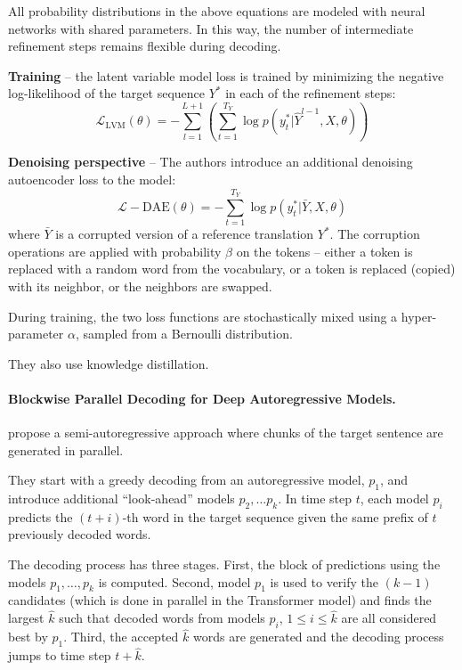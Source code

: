 All probability distributions in the above equations are modeled with neural
networks with shared parameters. In this way, the number of intermediate
refinement steps remains flexible during decoding.

\textbf{Training} -- the latent variable model loss is trained by minimizing the
negative log-likelihood of the target sequence $Y^*$ in each of the refinement
steps:
\begin{equation}
  \mathcal{L}_{\text{LVM}}(\theta) = - \sum_{l=1}^{L+1} \left(
    \sum_{t=1}^{T_Y} \log p(y_t^* | \hat{Y}^{l-1}, X, \theta)
  \right) \label{eq:refinement-lvm-loss}
\end{equation}


\textbf{Denoising perspective} -- The authors introduce an additional denoising
autoencoder loss to the model:
\begin{equation}
  \mathcal{L}-{\text{DAE}}(\theta) = - \sum_{t=1}^{T_Y} \log p(y_t^* | \bar{Y}, X, \theta)
\end{equation}
where $\bar{Y}$ is a corrupted version of a reference translation $Y^*$. The
corruption operations are applied with probability $\beta$ on the tokens --
either a token is replaced with a random word from the vocabulary, or a token is
replaced (copied) with its neighbor, or the neighbors are swapped.

During training, the two loss functions are stochastically mixed using a
hyper-parameter $\alpha$, sampled from a Bernoulli distribution.

They also use knowledge distillation.


\paragraph{Blockwise Parallel Decoding for Deep Autoregressive Models.}
\citet{stern2018blockwise} propose a semi-autoregressive approach where chunks
of the target sentence are generated in parallel.

They start with a greedy decoding from an autoregressive model, $p_1$, and
introduce additional ``look-ahead'' models $p_2, \ldots p_k$. In time step $t$,
each model $p_i$ predicts the $(t + i)$-th word in the target sequence given the
same prefix of $t$ previously decoded words.

The decoding process has three stages. First, the block of predictions using the
models $p_1, \ldots, p_k$ is computed. Second, model $p_1$ is used to verify the
$(k-1)$ candidates (which is done in parallel in the Transformer model) and
finds the largest $\hat{k}$ such that decoded words from models $p_i$,
$1 \leq i \leq \hat{k}$ are all considered best by $p_1$. Third, the accepted
$\hat{k}$ words are generated and the decoding process jumps to time step
$t + \hat{k}$.






